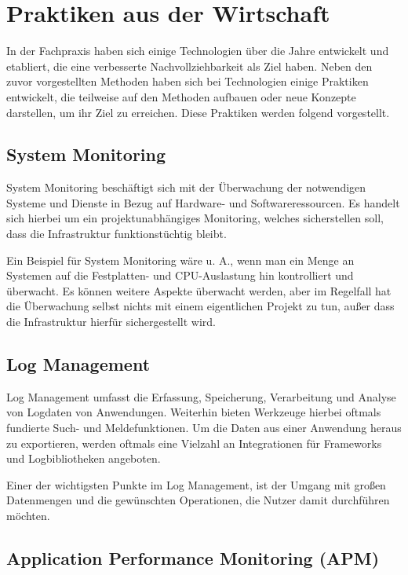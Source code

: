 \section{Praktiken aus der Wirtschaft}

In der Fachpraxis haben sich einige Technologien über die Jahre entwickelt und etabliert, die eine verbesserte Nachvollziehbarkeit als Ziel haben. Neben den zuvor vorgestellten Methoden haben sich bei Technologien einige Praktiken entwickelt, die teilweise auf den Methoden aufbauen oder neue Konzepte darstellen, um ihr Ziel zu erreichen. Diese Praktiken werden folgend vorgestellt.

\subsection{System Monitoring}

System Monitoring beschäftigt sich mit der Überwachung der notwendigen Systeme und Dienste in Bezug auf Hardware- und Softwareressourcen. Es handelt sich hierbei um ein projektunabhängiges Monitoring, welches sicherstellen soll, dass die Infrastruktur funktionstüchtig bleibt.

Ein Beispiel für System Monitoring wäre u. A., wenn man ein Menge an Systemen auf die Festplatten- und CPU-Auslastung hin kontrolliert und überwacht. Es können weitere Aspekte überwacht werden, aber im Regelfall hat die Überwachung selbst nichts mit einem eigentlichen Projekt zu tun, außer dass die Infrastruktur hierfür sichergestellt wird.

\subsection{Log Management}

Log Management umfasst die Erfassung, Speicherung, Verarbeitung und Analyse von Logdaten von Anwendungen. Weiterhin bieten Werkzeuge hierbei oftmals fundierte Such- und Meldefunktionen. Um die Daten aus einer Anwendung heraus zu exportieren, werden oftmals eine Vielzahl an Integrationen für Frameworks und Logbibliotheken angeboten.

Einer der wichtigsten Punkte im Log Management, ist der Umgang mit großen Datenmengen und die gewünschten Operationen, die Nutzer damit durchführen möchten.

\subsection{Application Performance Monitoring (APM)}

